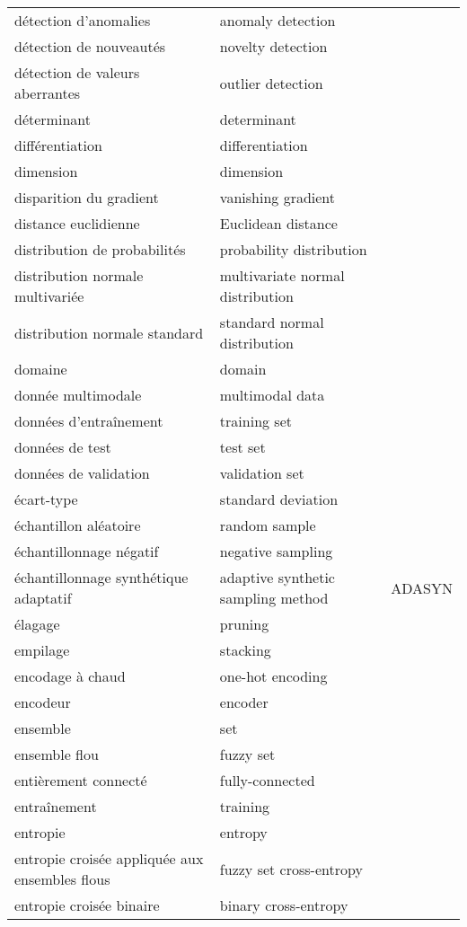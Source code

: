 \begin{longtable}{p{} p{} p{}}
détection d’anomalies & anomaly detection &  \\ 
détection de nouveautés & novelty detection &  \\ 
détection de valeurs aberrantes & outlier detection &  \\ 
déterminant & determinant &  \\ 
différentiation & differentiation &  \\ 
dimension & dimension &  \\ 
disparition du gradient & vanishing gradient &  \\ 
distance euclidienne & Euclidean distance &  \\ 
distribution de probabilités & probability distribution &  \\ 
distribution normale multivariée & multivariate normal distribution &  \\ 
distribution normale standard & standard normal distribution &  \\ 
domaine & domain &  \\ 
donnée multimodale & multimodal data &  \\ 
données d’entraînement & training set &  \\ 
données de test & test set &  \\ 
données de validation & validation set &  \\ 
écart-type & standard deviation &  \\ 
échantillon aléatoire & random sample &  \\ 
échantillonnage négatif & negative sampling &  \\ 
échantillonnage synthétique adaptatif & adaptive synthetic sampling method & ADASYN  \\ 
élagage & pruning &  \\ 
empilage & stacking &  \\ 
encodage à chaud & one-hot encoding &  \\ 
encodeur & encoder &  \\ 
ensemble & set &  \\ 
ensemble flou & fuzzy set &  \\ 
entièrement connecté & fully-connected &  \\ 
entraînement & training &  \\ 
entropie & entropy &  \\ 
entropie croisée appliquée aux ensembles flous & fuzzy set cross-entropy &  \\ 
entropie croisée binaire & binary cross-entropy &  \\ 

\end{longtable}
